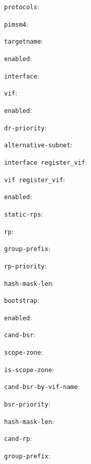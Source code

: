 \begin{description}
\item{\tt protocols}:
\item{\tt pimsm4}:
\item{\tt targetname}:
\item{\tt enabled}:
\item{\tt interface}:
\item{\tt vif}:
\begin{description}
\item{\tt enabled}:
\item{\tt dr-priority}:
\item{\tt alternative-subnet}:
\end{description}
\item{\tt interface register\_vif}:
\item{\tt vif register\_vif}:
\item{\tt enabled}:
\item{\tt static-rps}:
\begin{description}
\item{\tt rp}:
\begin{description}
\item{\tt group-prefix}:
\begin{description}
\item{\tt rp-priority}:
\item{\tt hash-mask-len}:
\end{description}
\end{description}
\end{description}
\item{\tt bootstrap}:
\begin{description}
\item{\tt enabled}:
\item{\tt cand-bsr}:
\begin{description}
\item{\tt scope-zone}:
\item{\tt is-scope-zone}:
\item{\tt cand-bsr-by-vif-name}:
\item{\tt bsr-priority}:
\item{\tt hash-mask-len}:
\end{description}
\end{description}
\item{\tt cand-rp}:
\begin{description}
\item{\tt group-prefix}:
\begin{description}

\end{description}
\end{description}
\end{description}
